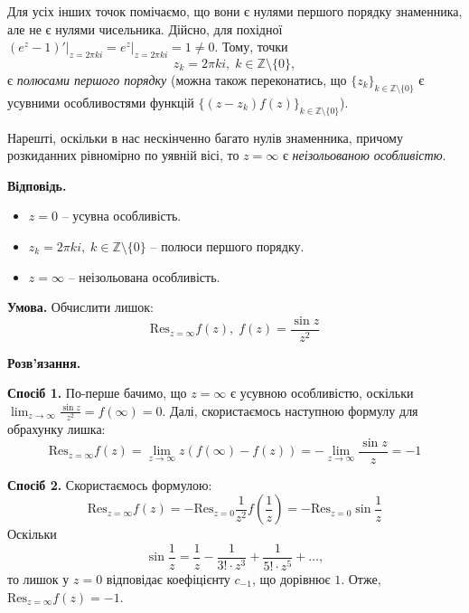 \documentclass[oneside,solution]{karazin-complan-assign}
\begin{document}
Для усіх інших точок помічаємо, що вони є нулями першого порядку знаменника, але не є нулями чисельника. Дійсно, для похідної $(e^z-1)'\Big|_{z=2\pi k i}=e^z\Big|_{z=2\pi k i}=1 \neq 0$. Тому, точки
\begin{equation}
    z_k = 2\pi k i, \; k \in \mathbb{Z} \setminus \{0\},
\end{equation}
є \textit{полюсами першого порядку} (можна також переконатись, що $\{z_k\}_{k \in \mathbb{Z} \setminus \{0\}}$ є усувними особливостями функцій $\{(z-z_k)f(z)\}_{k \in \mathbb{Z} \setminus \{0\}}$). 

Нарешті, оскільки в нас нескінченно багато нулів знаменника, причому розкиданних рівномірно по уявній вісі, то $z=\infty$ є \textit{неізольованою особливістю}.

\textbf{Відповідь.} 
\begin{itemize}
    \item $z=0$ -- усувна особливість.
    \item $z_k=2\pi k i, \; k \in \mathbb{Z} \setminus \{0\}$ -- полюси першого порядку.
    \item $z=\infty$ -- неізольована особливість.
\end{itemize}
\pagebreak
\problem{}

\hspace{20px}\textbf{Умова.} Обчислити лишок:
\begin{equation*}
    \text{Res}_{z=\infty}f(z), \; f(z)= \frac{\sin z}{z^2}
\end{equation*}

\textbf{Розв'язання.} 

\textbf{Спосіб 1.} По-перше бачимо, що $z=\infty$ є усувною особливістю, оскільки $\lim_{z \to \infty} \frac{\sin z}{z^2} = f(\infty)= 0$. Далі, скористаємось наступною формулу для обрахунку лишка:
\begin{equation}
    \text{Res}_{z=\infty}f(z) = \lim_{z \to \infty} z(f(\infty)-f(z)) = -\lim_{z \to \infty} \frac{\sin z}{z} = \boxed{-1}
\end{equation}

\textbf{Спосіб 2.} Скористаємось формулою:
\begin{equation}
    \text{Res}_{z=\infty}f(z) = -\text{Res}_{z=0}\frac{1}{z^2}f\left(\frac{1}{z}\right) = -\text{Res}_{z=0}\sin\frac{1}{z}
\end{equation}
Оскільки
\begin{equation}
    \sin \frac{1}{z} = \frac{1}{z} - \frac{1}{3!\cdot z^3} + \frac{1}{5!\cdot z^5} + \dots,
\end{equation}
то лишок у $z=0$ відповідає коефіцієнту $c_{-1}$, що дорівнює $1$. Отже, $\text{Res}_{z=\infty}f(z)=-1$.
\end{document}

